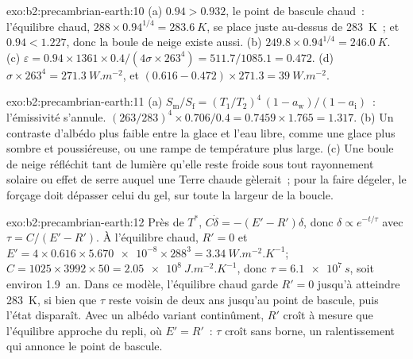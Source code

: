 \begin{solution}{exo:b2:precambrian-earth:10}
(a) $0.94 > 0.932$, le point de bascule chaud~: l'équilibre chaud, $288\times0.94^{1/4} =
\qty{283.6}{K}$, se place juste au-dessus de \qty{283}{K}~; et $0.94 < 1.227$, donc la boule de neige existe aussi.
(b) $249.8\times0.94^{1/4} = \qty{246.0}{K}$. (c) $\varepsilon = 0.94\times1361\times0.4/(4\sigma
\times263^4) = 511.7/1085.1 = 0.472$. (d) $\sigma\times263^4 = \qty{271.3}{W.m^{-2}}$, et $(0.616
- 0.472)\times271.3 = \qty{39}{W.m^{-2}}$.
\end{solution}

\begin{solution}{exo:b2:precambrian-earth:11}
(a) $S_{\text{m}}/S_{\text{f}} = (T_1/T_2)^4\,(1 - a_{\text{w}})/(1 - a_{\text{i}})$~: l'émissivité
s'annule. $(263/283)^4\times0.706/0.4 = 0.7459\times1.765 = 1.317$. (b) Un contraste
d'albédo plus faible entre la glace et l'eau libre, comme une glace plus sombre et poussiéreuse, ou une rampe de
température plus large. (c) Une boule de neige réfléchit tant de lumière qu'elle reste froide sous tout rayonnement solaire ou
effet de serre auquel une Terre chaude gèlerait~; pour la faire dégeler, le forçage doit dépasser celui du
gel, sur toute la largeur de la boucle.
\end{solution}

\begin{solution}{exo:b2:precambrian-earth:12}
Près de $T^*$, $C\dot\delta = -(E' - R')\delta$, donc $\delta \propto e^{-t/\tau}$ avec $\tau =
C/(E' - R')$. À l'équilibre chaud, $R' = 0$ et $E' = 4\times0.616\times\num{5.670e-8}\times
288^3 = \qty{3.34}{W.m^{-2}.K^{-1}}$; $C = 1025\times3992\times50 = \qty{2.05e8}{J.m^{-2}.K^{-1}}$,
donc $\tau = \qty{6.1e7}{s}$, soit environ \qty{1.9}{an}. Dans ce modèle, l'équilibre chaud garde $R' =
0$ jusqu'à atteindre \qty{283}{K}, si bien que $\tau$ reste voisin de deux ans jusqu'au point de bascule, puis
l'état disparaît. Avec un albédo variant continûment, $R'$ croît à mesure que l'équilibre approche du
repli, où $E' = R'$~: $\tau$ croît sans borne, un ralentissement qui annonce le point de
bascule.
\end{solution}

